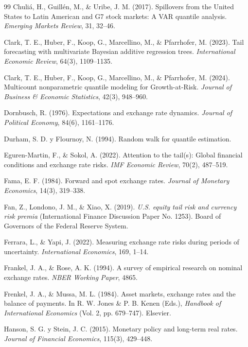 ﻿\documentclass[11pt,a4paper]{article}
\begin{document}
\begin{thebibliography}{99}
Chuliá, H., Guillén, M., \& Uribe, J. M. (2017). Spillovers from the United States to Latin American and G7 stock markets: A VAR quantile analysis. \textit{Emerging Markets Review}, 31, 32--46.

Clark, T. E., Huber, F., Koop, G., Marcellino, M., \& Pfarrhofer, M. (2023). Tail forecasting with multivariate Bayesian additive regression trees. \textit{International Economic Review}, 64(3), 1109--1135.

Clark, T. E., Huber, F., Koop, G., Marcellino, M., \& Pfarrhofer, M. (2024). Multicount nonparametric quantile modeling for Growth-at-Risk. \textit{Journal of Business \& Economic Statistics}, 42(3), 948--960.

Dornbusch, R. (1976). Expectations and exchange rate dynamics. \textit{Journal of Political Economy}, 84(6), 1161--1176.

Durham, S. D. y Flournoy, N. (1994). Random walk for quantile estimation. %

Eguren-Martin, F., \& Sokol, A. (2022). Attention to the tail(s): Global financial conditions and exchange rate risks. \textit{IMF Economic Review}, 70(2), 487--519.

Fama, E. F. (1984). Forward and spot exchange rates. \textit{Journal of Monetary Economics}, 14(3), 319--338.

Fan, Z., Londono, J. M., \& Xiao, X. (2019). \textit{U.S. equity tail risk and currency risk premia} (International Finance Discussion Paper No. 1253). Board of Governors of the Federal Reserve System.

Ferrara, L., \& Yapi, J. (2022). Measuring exchange rate risks during periods of uncertainty. \textit{International Economics}, 169, 1--14.

Frankel, J. A., \& Rose, A. K. (1994). A survey of empirical research on nominal exchange rates. \textit{NBER Working Paper}, 4865.

Frenkel, J. A., \& Mussa, M. L. (1984). Asset markets, exchange rates and the balance of payments. In R. W. Jones \& P. B. Kenen (Eds.), \textit{Handbook of International Economics} (Vol. 2, pp. 679--747). Elsevier.

Hanson, S. G. y Stein, J. C. (2015). Monetary policy and long-term real rates. \textit{Journal of Financial Economics}, 115(3), 429--448.


\end{thebibliography}
\end{document}

